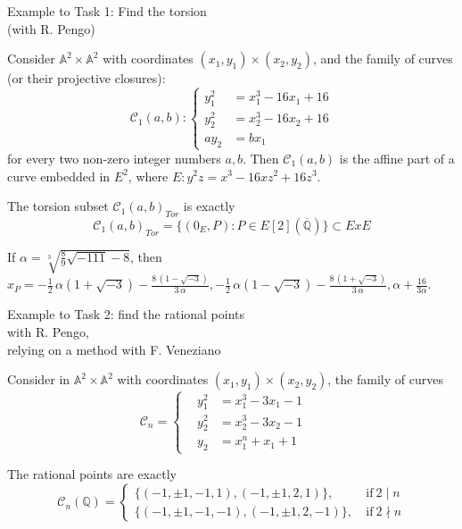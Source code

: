 \documentclass[12pt]{beamer}
\newcommand{\Ci}{\mathcal{C}}
\begin{document}
\begin{frame}{Example to Task 1: Find the torsion \\ (with R. Pengo)}
\begin{example} Consider $\mathbb{A}^2\times\mathbb{A}^2$ with coordinates  $(x_1,y_1)\times (x_2,y_2)$, and the family of curves (or their projective closures):
\[
	\mathcal{C}_1(a,b) \colon \begin{cases}
		
		y_1^2 &= x_1^3 -16 x_1 + 16 \\
		y_2^2 &= x_2^3 -16 x_2 + 16\\
		a y_2 &= b x_1 	\end{cases}
\]
for every two non-zero integer numbers $a,b$. Then $\mathcal{C}_1(a,b)$ is the affine part of a curve embedded in $E^2$, where $E \colon y^2 z = x^3 - 16 x z^2 + 16 z^3$. 

\pause

\begin{alertblock}
{The torsion subset $\mathcal{C}_1(a,b)_{Tor}$ is exactly}
\[
\Ci_1(a,b)_{Tor}=\{(0_E,P) : P \in E[2](\overline{\mathbb{Q}})\}\subset ExE
\]
\end{alertblock}
\vspace{0.2cm}
If $\alpha = \sqrt[3]{\frac{8}{9} \sqrt{-111} - 8}$, then $x_P=-\frac{1}{2} \, \alpha {\left(1 + \sqrt{-3}\right)} - \frac{8 \, {\left(1 - \sqrt{-3}\right)}}{3 \, \alpha}, -\frac{1}{2} \, \alpha {\left(1 - \sqrt{-3}\right)} - \frac{8 \, {\left(1 + \sqrt{-3}\right)}}{3 \, \alpha}, \alpha + \frac{16}{3 \alpha}$.
\end{example}
\end{frame}



\begin{frame}{Example to Task 2: find the rational points\\
with R. Pengo, \\ relying on a method with F. Veneziano}
\begin{example}

Consider in $\mathbb{A}^2\times\mathbb{A}^2$ with coordinates  $(x_1,y_1)\times (x_2,y_2)$, the family of curves
\begin{equation*}
\mathcal{C}_n=\begin{cases}
\,\,\,\,\,y_1^2&=x_1^3-3x_1-1\,\,\,\,\,\,\,\,\\
\,\,\,\,\,y_2^2&=x_2^3-3x_2-1\,\,\,\,\,\,\,\,\\
\,\,\,\,\,y_2&=x_1^n+x_1+1
\end{cases}
\end{equation*}
\pause
\begin{alertblock}
{The rational points are exactly} \[
		\mathcal{C}_{n}(\mathbb{Q}) = \begin{cases}
			\{(-1,\pm 1,-1,1),(-1,\pm 1,2,1)\}, \ &\text{if}  \ 2 \mid n \\
			\{(-1,\pm 1,-1,-1),(-1,\pm 1,2,-1)\}, \ &\text{if} \ 2 \nmid n 
		\end{cases}
	\]

\end{alertblock}
\end{example}
\end{frame}
\end{document}
